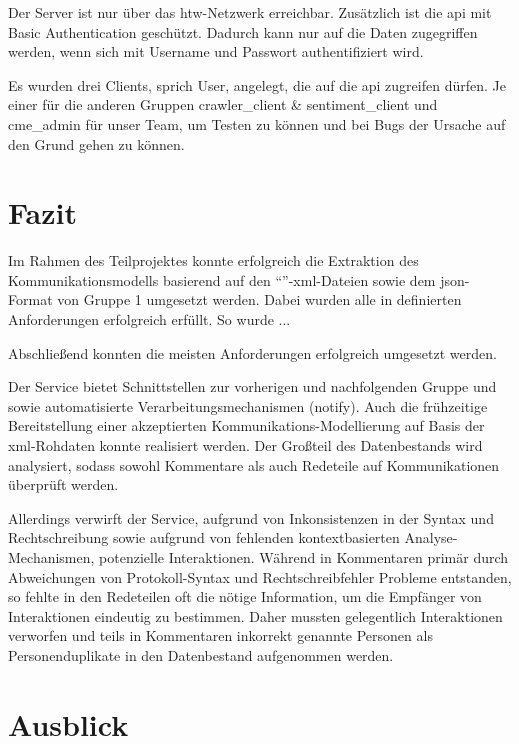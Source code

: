 Der Server ist nur über das \gls{htw}-Netzwerk erreichbar. Zusätzlich ist die \gls{api} mit
Basic Authentication geschützt. Dadurch kann nur auf die Daten zugegriffen
werden, wenn sich mit Username und Passwort authentifiziert wird.

Es wurden drei Clients, sprich User, angelegt, die auf die \gls{api} zugreifen
dürfen. Je einer für die anderen Gruppen crawler\_client \& sentiment\_client und
cme\_admin für unser Team, um Testen zu können und bei Bugs der Ursache auf den
Grund gehen zu können.

\section{Fazit}\label{sec:03_05_fazit}

Im Rahmen des Teilprojektes konnte erfolgreich die Extraktion des
Kommunikationsmodells basierend auf den
\enquote{}-\gls{xml}-Dateien sowie dem
\gls{json}-Format von Gruppe 1 umgesetzt werden. Dabei wurden alle in
 definierten Anforderungen erfolgreich erfüllt. So wurde ...

Abschließend konnten die meisten  Anforderungen
erfolgreich umgesetzt werden.

Der Service bietet Schnittstellen zur vorherigen und nachfolgenden Gruppe und
sowie automatisierte Verarbeitungsmechanismen (notify). Auch die frühzeitige
Bereitstellung einer akzeptierten Kommunikations-Modellierung auf Basis der
\gls{xml}-Rohdaten konnte realisiert werden. Der Großteil des Datenbestands wird
analysiert, sodass sowohl Kommentare als auch Redeteile auf Kommunikationen
überprüft werden.

Allerdings verwirft der Service, aufgrund von Inkonsistenzen in der Syntax und
Rechtschreibung sowie aufgrund von fehlenden kontextbasierten
Analyse-Mechanismen, potenzielle Interaktionen. Während in Kommentaren primär durch
Abweichungen von Protokoll-Syntax und Rechtschreibfehler Probleme entstanden,
so fehlte in den Redeteilen oft die nötige Information, um die Empfänger von
Interaktionen eindeutig zu bestimmen. Daher mussten gelegentlich Interaktionen verworfen
und teils in Kommentaren inkorrekt genannte Personen als
Personenduplikate in den Datenbestand aufgenommen werden.

\section{Ausblick}\label{sec:03_6_ausblick}

